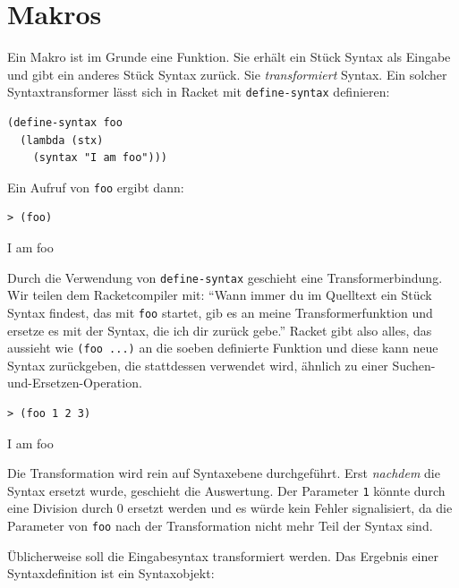 \section{Makros} 
\label{makros}

Ein Makro ist im Grunde eine Funktion. Sie erhält ein Stück Syntax als Eingabe und gibt ein anderes Stück Syntax zurück. Sie \textit{transformiert} Syntax. Ein solcher Syntaxtransformer lässt sich in Racket mit \texttt{define-syntax} definieren:

\begin{lstlisting}
(define-syntax foo
  (lambda (stx)
    (syntax "I am foo")))
\end{lstlisting}

Ein Aufruf von \texttt{foo} ergibt dann:

\begin{lstlisting}
> (foo)
\end{lstlisting}
{\routput {\qq}I am foo{\qq}}

Durch die Verwendung von \texttt{define-syntax} geschieht eine Transformerbindung. Wir teilen dem Racketcompiler mit: ``Wann immer du im Quelltext ein Stück Syntax findest, das mit \texttt{foo} startet, gib es an meine Transformerfunktion und ersetze es mit der Syntax, die ich dir zurück gebe.'' Racket gibt also alles, das aussieht wie \texttt{(foo ...)} an die soeben definierte Funktion und diese kann neue Syntax zurückgeben, die stattdessen verwendet wird, ähnlich zu einer Suchen-und-Ersetzen-Operation.

\begin{lstlisting}
> (foo 1 2 3)
\end{lstlisting}
{\routput {\qq}I am foo\qq}

Die Transformation wird rein auf Syntaxebene durchgeführt. Erst \textit{nachdem} die Syntax ersetzt wurde, geschieht die Auswertung. Der Parameter \texttt{1} könnte  durch eine Division durch 0 ersetzt werden und es würde kein Fehler signalisiert, da die Parameter von \texttt{foo} nach der Transformation nicht mehr Teil der Syntax sind.

Üblicherweise soll die Eingabesyntax transformiert werden. Das Ergebnis einer Syntaxdefinition ist ein Syntaxobjekt:

